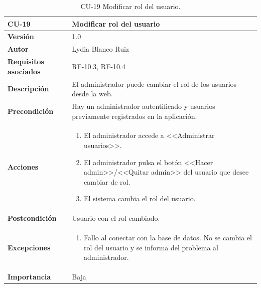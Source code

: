 \begin{table}[p]
	\centering
	\begin{tabularx}{\linewidth}{ p{} p{} }
		\toprule
		\textbf{CU-19}    & \textbf{ Modificar rol del usuario}\\
		\toprule
		\textbf{Versión}              & 1.0    \\
		\textbf{Autor}                & Lydia Blanco Ruiz \\
		\textbf{Requisitos asociados} & RF-10.3, RF-10.4 \\
		\textbf{Descripción}          & El administrador puede cambiar el rol de los usuarios desde la web. \\
		\textbf{Precondición}         & Hay un administrador autentificado y usuarios previamente registrados en la aplicación. \\
		\textbf{Acciones}             &
		\begin{enumerate}
			\def\labelenumi{\arabic{enumi}.}
			\tightlist
			\item El administrador accede a <<Administrar usuarios>>.
			\item El administrador pulsa el botón <<Hacer admin>>/<<Quitar admin>> del usuario que desee cambiar de rol.
			\item El sistema cambia el rol del usuario.
		\end{enumerate}\\
		\textbf{Postcondición}        & Usuario con el rol cambiado. \\
		\textbf{Excepciones}          & 
		\begin{enumerate}
			\def\labelenumi{\arabic{enumi}.}
			\tightlist
			\item Fallo al conectar con la base de datos. No se cambia el rol del usuario y se informa del problema al administrador.
		\end{enumerate}\\
		\textbf{Importancia}          & Baja  \\
		\bottomrule
	\end{tabularx}
	\caption{CU-19 Modificar rol del usuario.}
\end{table}

